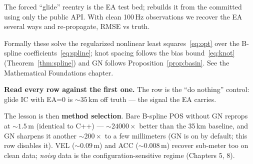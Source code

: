 The forced ``glide'' reentry is the EA test bed; 
rebuilds it from the committed  using only the
public API. With clean 100\,Hz observations we recover the EA several ways
and re-propagate, RMSE vs truth.

Formally these solve the regularized nonlinear least
squares~\eqref{eq:opt} over the B-spline coefficients~\eqref{eq:spline};
knot spacing follows the bias bound~\eqref{eq:knot}
(Theorem~\ref{thm:spline}) and GN follows Proposition~\ref{prop:basin}.
See the Mathematical Foundations chapter.


\textbf{Read every row against the first one.} The
 row is the ``do nothing'' control: glide IC with
EA=0 is ${\sim}35\,$km off truth --- the signal the EA carries.

The lesson is then \textbf{method selection}. Bare B-spline POS without GN
reprops at ${\sim}1.5\,$m (identical to C++) --- ${\sim}24000\times$ better
than the 35\,km baseline, and GN sharpens it another ${\sim}200\times$ to a
few millimeters (GN is on by default; this row disables it). VEL
(${\sim}0.09\,$m) and ACC (${\sim}0.008\,$m) recover sub-meter too on clean
data; \emph{noisy} data is the configuration-sensitive regime (Chapters 5, 8).
